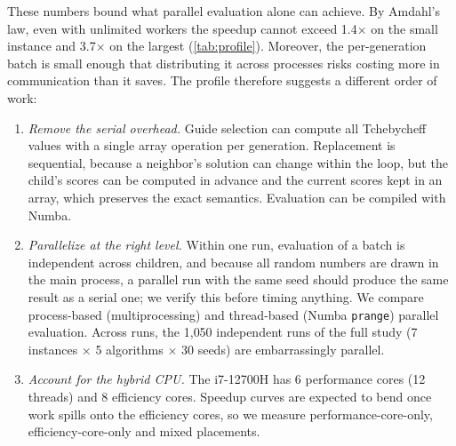 These numbers bound what parallel evaluation alone can achieve. By Amdahl's law,
even with unlimited workers the speedup cannot exceed 1.4$\times$ on the small
instance and 3.7$\times$ on the largest (\cref{tab:profile}). Moreover, the
per-generation batch is small enough that distributing it across processes risks
costing more in communication than it saves. The profile therefore suggests a
different order of work:
\begin{enumerate}
\item \emph{Remove the serial overhead.} Guide selection can compute all
  Tchebycheff values with a single array operation per generation. Replacement is
  sequential, because a neighbor's solution can change within the loop, but the
  child's scores can be computed in advance and the current scores kept in an
  array, which preserves the exact semantics. Evaluation can be compiled with
  Numba.
\item \emph{Parallelize at the right level.} Within one run, evaluation of a batch
  is independent across children, and because all random numbers are drawn in the
  main process, a parallel run with the same seed should produce the same result
  as a serial one; we verify this before timing anything. We compare process-based (multiprocessing) and thread-based (Numba
  \texttt{prange}) parallel evaluation. Across runs, the 1{,}050 independent runs
  of the full study (7 instances $\times$ 5 algorithms $\times$ 30 seeds) are
  embarrassingly parallel.
\item \emph{Account for the hybrid CPU.} The i7-12700H has 6 performance cores
  (12 threads) and 8 efficiency cores. Speedup curves are expected to bend once
  work spills onto the efficiency cores, so we measure performance-core-only,
  efficiency-core-only and mixed placements.
\end{enumerate}

